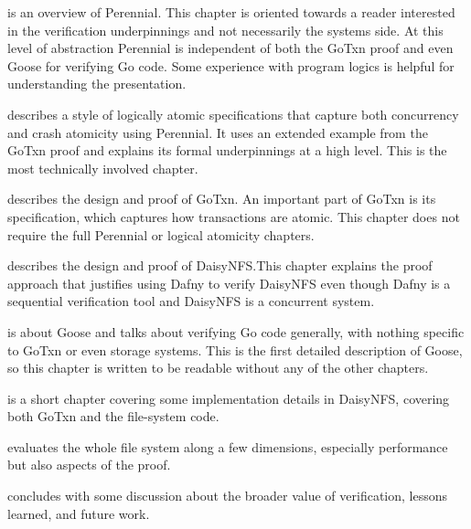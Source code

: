  is an overview of Perennial. This chapter is oriented
towards a reader interested in the verification underpinnings and not
necessarily the systems side. At this level of abstraction Perennial is
independent of both the GoTxn proof and even Goose for verifying Go code. Some
experience with program logics is helpful for understanding the presentation.

 describes a style of logically atomic specifications
that capture both concurrency and crash atomicity using Perennial. It uses an
extended example from the GoTxn proof and explains its formal underpinnings at a
high level. This is the most technically involved chapter.

 describes the design and proof of GoTxn. An important part of GoTxn is its
specification, which captures how transactions are atomic. This chapter does not
require the full Perennial or logical atomicity chapters.

 describes the design and proof of DaisyNFS.\@ This chapter
explains the proof approach that justifies using Dafny to verify DaisyNFS even
though Dafny is a sequential verification tool and DaisyNFS is a concurrent
system.

 is about Goose and talks about verifying Go code generally, with
nothing specific to GoTxn or even storage systems. This is the first detailed
description of Goose, so this chapter is written to be readable without any of
the other chapters.

 is a short chapter covering some implementation details in
DaisyNFS, covering both GoTxn and the file-system code.

 evaluates the whole file system along a few dimensions,
especially performance but also aspects of the proof.

 concludes with some discussion about the broader value of
verification, lessons learned, and future work.
